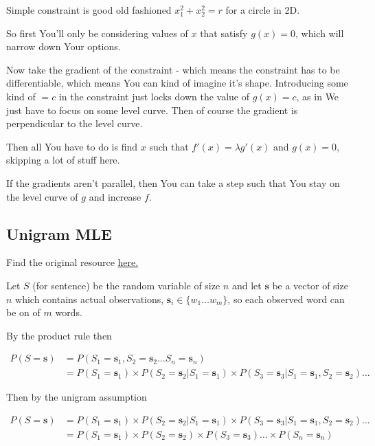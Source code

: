 \documentclass{article}
\begin{document}
		Simple constraint is good old fashioned $x_1^2+x_2^2=r$ for a circle in 2D.
		
		So first You'll only be considering values of $x$ that satisfy $g(x)=0$, which will narrow down Your options.
		
		Now take the gradient of the constraint - which means the constraint has to be differentiable, which means You can kind of imagine it's shape. Introducing some kind of $=c$ in the constraint just locks down the value of $g(x)=c$, as in We just have to focus on some level curve. Then of course the gradient is perpendicular to the level curve.
		
		Then all You have to do is find $x$ such that $f'(x) = \lambda g'(x)$ and $g(x)=0$, skipping a lot of stuff here.
		
		If the gradients aren't parallel, then You can take a step such that You stay on the level curve of $g$ and increase $f$.
		
	\subsection{Unigram MLE}
	
		Find the original resource \href{https://leimao.github.io/blog/Maximum-Likelihood-Estimation-Ngram/}{here.}
		
		Let $S$ (for sentence) be the random variable of size $n$ and let $\mathbf{s}$ be a vector of size $n$ which contains actual observations, $\mathbf{s}_i\in\{ w_1\ldots w_m \}$, so each observed word can be on of $m$ words.
		
		By the product rule then
		
		\begin{align}
			P(S=\mathbf{s}) &= P(S_1=\mathbf{s}_1, S_2=\mathbf{s}_2\ldots S_n=\mathbf{s}_n)\\
			&= P(S_1=\mathbf{s}_1)\times P(S_2=\mathbf{s}_2 | S_1=\mathbf{s}_1) \times P(S_3=\mathbf{s}_3 | S_1=\mathbf{s}_1, S_2=\mathbf{s}_2)...
		\end{align}		
			
		Then by the unigram assumption
		
		\begin{align}
			P(S=\mathbf{s}) &= P(S_1=\mathbf{s}_1)\times P(S_2=\mathbf{s}_2 | S_1=\mathbf{s}_1) \times P(S_3=\mathbf{s}_3 | S_1=\mathbf{s}_1, S_2=\mathbf{s}_2)...\\
			&= P(S_1=\mathbf{s}_1)\times P(S_2=\mathbf{s}_2)\times P(S_3=\mathbf{s}_3)\ldots \times P(S_n=\mathbf{s}_n)
		\end{align}
		
\end{document}
